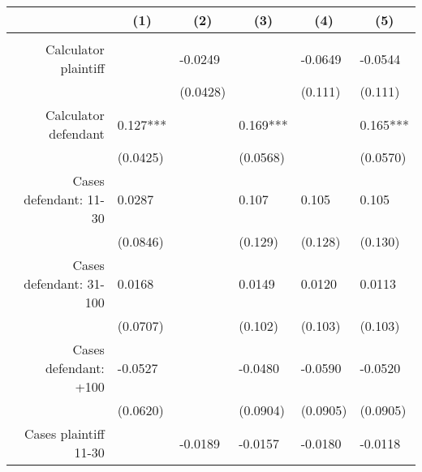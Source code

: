 \begin{tabular}{rrrrrr}
\toprule
      & \multicolumn{1}{c}{(1)} & \multicolumn{1}{c}{(2)} & \multicolumn{1}{c}{(3)} & \multicolumn{1}{c}{(4)} & \multicolumn{1}{c}{(5)} \\
\midrule
      & \multicolumn{1}{l}{} & \multicolumn{1}{l}{} & \multicolumn{1}{l}{} & \multicolumn{1}{l}{} & \multicolumn{1}{l}{} \\
Calculator plaintiff & \multicolumn{1}{l}{} & \multicolumn{1}{l}{-0.0249} & \multicolumn{1}{l}{} & \multicolumn{1}{l}{-0.0649} & \multicolumn{1}{l}{-0.0544} \\
      & \multicolumn{1}{l}{} & \multicolumn{1}{l}{(0.0428)} & \multicolumn{1}{l}{} & \multicolumn{1}{l}{(0.111)} & \multicolumn{1}{l}{(0.111)} \\
Calculator defendant & \multicolumn{1}{l}{0.127***} & \multicolumn{1}{l}{} & \multicolumn{1}{l}{0.169***} & \multicolumn{1}{l}{} & \multicolumn{1}{l}{0.165***} \\
      & \multicolumn{1}{l}{(0.0425)} & \multicolumn{1}{l}{} & \multicolumn{1}{l}{(0.0568)} & \multicolumn{1}{l}{} & \multicolumn{1}{l}{(0.0570)} \\
Cases defendant: 11-30 & \multicolumn{1}{l}{0.0287} & \multicolumn{1}{l}{} & \multicolumn{1}{l}{0.107} & \multicolumn{1}{l}{0.105} & \multicolumn{1}{l}{0.105} \\
      & \multicolumn{1}{l}{(0.0846)} & \multicolumn{1}{l}{} & \multicolumn{1}{l}{(0.129)} & \multicolumn{1}{l}{(0.128)} & \multicolumn{1}{l}{(0.130)} \\
Cases defendant: 31-100 & \multicolumn{1}{l}{0.0168} & \multicolumn{1}{l}{} & \multicolumn{1}{l}{0.0149} & \multicolumn{1}{l}{0.0120} & \multicolumn{1}{l}{0.0113} \\
      & \multicolumn{1}{l}{(0.0707)} & \multicolumn{1}{l}{} & \multicolumn{1}{l}{(0.102)} & \multicolumn{1}{l}{(0.103)} & \multicolumn{1}{l}{(0.103)} \\
Cases defendant: +100 & \multicolumn{1}{l}{-0.0527} & \multicolumn{1}{l}{} & \multicolumn{1}{l}{-0.0480} & \multicolumn{1}{l}{-0.0590} & \multicolumn{1}{l}{-0.0520} \\
      & \multicolumn{1}{l}{(0.0620)} & \multicolumn{1}{l}{} & \multicolumn{1}{l}{(0.0904)} & \multicolumn{1}{l}{(0.0905)} & \multicolumn{1}{l}{(0.0905)} \\
Cases plaintiff 11-30 & \multicolumn{1}{l}{} & \multicolumn{1}{l}{-0.0189} & \multicolumn{1}{l}{-0.0157} & \multicolumn{1}{l}{-0.0180} & \multicolumn{1}{l}{-0.0118} \\

\end{tabular}

